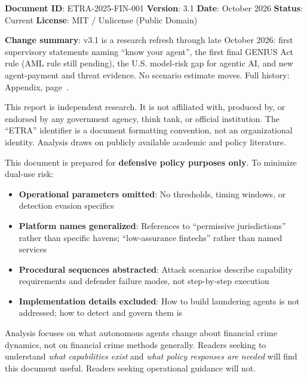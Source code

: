 \documentclass[11pt,letterpaper]{article}
\begin{document}
\begin{infobox}
\textbf{Document ID}: ETRA-2025-FIN-001 \textbar{} \textbf{Version}: 3.1 \textbar{} \textbf{Date}: October 2026 \textbar{} \textbf{Status}: Current \textbar{} \textbf{License}: MIT / Unlicense (Public Domain)

\textbf{Change summary}: v3.1 is a research refresh through late October 2026: first supervisory statements naming ``know your agent'', the first final GENIUS Act rule (AML rule still pending), the U.S. model-risk gap for agentic AI, and new agent-payment and threat evidence. No scenario estimate moves. Full history: Appendix, page~\pageref{sec:history}.
\end{infobox}

\begin{infobox}
This report is independent research. It is not affiliated with, produced by, or endorsed by any government agency, think tank, or official institution. The ``ETRA'' identifier is a document formatting convention, not an organizational identity. Analysis draws on publicly available academic and policy literature.
\end{infobox}

\begin{warnbox}
This document is prepared for \textbf{defensive policy purposes only}. To minimize dual-use risk:
\begin{itemize}
  \item \textbf{Operational parameters omitted}: No thresholds, timing windows, or detection evasion specifics
  \item \textbf{Platform names generalized}: References to ``permissive jurisdictions'' rather than specific havens; ``low-assurance fintechs'' rather than named services
  \item \textbf{Procedural sequences abstracted}: Attack scenarios describe capability requirements and defender failure modes, not step-by-step execution
  \item \textbf{Implementation details excluded}: How to build laundering agents is not addressed; how to detect and govern them is
\end{itemize}
Analysis focuses on what autonomous agents change about financial crime dynamics, not on financial crime methods generally. Readers seeking to understand \textit{what capabilities exist} and \textit{what policy responses are needed} will find this document useful. Readers seeking operational guidance will not.
\end{warnbox}
\end{document}
